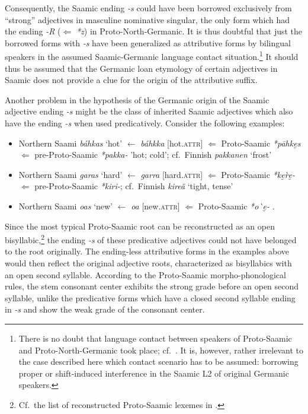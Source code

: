 {Consequently, the Saamic ending \textit{-s} could have been borrowed exclusively from “strong” adjectives in masculine nominative singular, the only form which had the ending \textit{-R} ($\Leftarrow$ \textit{*z}) in Proto-North-Germanic. It is thus doubtful that just the borrowed forms with \textit{-s} have been generalized as attributive forms by bilingual speakers in the assumed Saamic-Germanic language contact situation.\footnote{There is no doubt that language contact between speakers of Proto-Saamic and Proto-North-Germanic took place; cf.~\citealt{kusmenko2008}. It is, however, rather irrelevant to the case described here which contact scenario has to be assumed: borrowing proper or shift-induced interference in the Saamic L2 of original Germanic speakers.} It should thus be assumed that the Germanic loan etymology of certain adjectives in Saamic does not provide a clue for the origin of the attributive suffix. 

Another problem in the hypothesis of the Germanic origin of the Saamic adjective ending \textit{-s} might be the class of inherited Saamic adjectives which also have the ending \textit{-s} when used predicatively. Consider the following examples:
\begin{itemize}
\item Northern Saami \textit{báhkas} ‘hot’ $\leftarrow$ \textit{báhkka} [hot.\textsc{attr}] $\Leftarrow$ Proto-Saamic \textit{*pāhke̮s} $\Leftarrow$ pre-Proto-Saamic \textit{*pakka-} 'hot; cold’; cf.~Finnish \textit{pakkanen} ‘frost’ \cite[230]{sammallahti1998b}
\item Northern Saami \textit{garas} ‘hard’ $\leftarrow$ \textit{garra} [hard.\textsc{attr}] $\Leftarrow$ Proto-Saamic \textit{*ke̮\`re̮-} $\Leftarrow$ pre-Proto-Saamic \textit{*kiri-}; cf.~Finnish \textit{kireä} ‘tight, tense’ \cite[242]{sammallahti1998b}
\item Northern Saami \textit{o{\dj}as} ‘new’ $\leftarrow$ \textit{o{\dj}{\dj}a} [new.\textsc{attr}] $\Leftarrow$ Proto-Saamic \textit{*o\`{\dh}e̮-} \cite[258]{sammallahti1998b}.
\end{itemize}
Since the most typical Proto-Saamic root can be reconstructed as an open bisyllabic,\footnote{Cf.~the list of reconstructed Proto-Saamic lexemes in \cite{lehtiranta1989}.} the ending \textit{-s} of these predicative adjectives could not have belonged to the root originally. The ending-less attributive forms in the examples above would then reflect the original adjective roots, characterized as bisyllabics with an open second syllable. According to the Proto-Saamic morpho-phonological rules, the stem consonant center exhibits the strong grade before an open second syllable, unlike the predicative forms which have a closed second syllable ending in \textit{-s} and show the weak grade of the consonant center.

}
